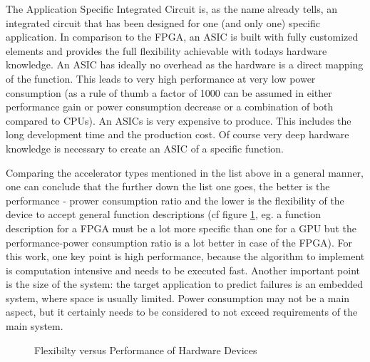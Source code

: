 \documentclass[mscthesis]{usiinfthesis}
\begin{document}
\begin{description}
        The Application Specific Integrated Circuit is, as the name already
        tells, an integrated circuit that has been designed for one (and only
        one) specific application. In comparison to the FPGA, an ASIC is built
        with fully customized elements and provides the full flexibility
        achievable with todays hardware knowledge. An ASIC has ideally no
        overhead as the hardware is a direct mapping of the function. This
        leads to very high performance at very low power consumption (as a rule
        of thumb a factor of 1000 can be assumed in either performance gain or
        power consumption decrease or a combination of both compared to CPUs).
        An ASICs is very expensive to produce. This includes the long
        development time and the production cost. Of course very deep hardware
        knowledge is necessary to create an ASIC of a specific function.
\end{description}

Comparing the accelerator types mentioned in the list above in a general
manner, one can conclude that the further down the list one goes, the better is
the performance - prower consumption ratio and the lower is the flexibility of
the device to accept general function descriptions (cf figure \ref{fig:hw}, eg.
a function description for a FPGA must be a lot more specific than one for
a GPU but the performance-power consumption ratio is a lot better in case of
the FPGA). For this work, one key point is high performance, because the
algorithm to implement is computation intensive and needs to be executed fast.
Another important point is the size of the system: the target application to
predict failures is an embedded system, where space is usually limited. Power
consumption may not be a main aspect, but it certainly needs to be considered
to not exceed requirements of the main system.

\begin{figure}
    \centering
    
    \caption{Flexibilty versus Performance of Hardware Devices}
    \label{fig:hw}
\end{figure}
\end{document}
